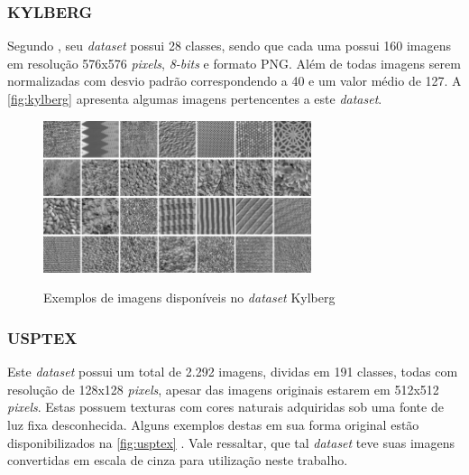 \subsubsection{KYLBERG}
\label{subsubsec:kylberg}

\par Segundo , seu \textit{dataset} possui 28 classes, sendo que cada uma possui 160 imagens em resolução 576x576 \textit{pixels}, \textit{8-bits} e formato PNG. Além de todas imagens serem normalizadas com desvio padrão correspondendo a 40 e um valor médio de 127. A \autoref{fig:kylberg} apresenta algumas imagens pertencentes a este \textit{dataset}.

\begin{figure}[!h]
    \centering
    \caption{Exemplos de imagens disponíveis no \textit{dataset} Kylberg}
    \includegraphics[width=0.7\textwidth]{./dados/figuras/kylberg.jpg}
    \label{fig:kylberg}
\end{figure}


\subsubsection{USPTEX}
\label{subsubsec:usptex}

\par Este \textit{dataset} possui um total de 2.292 imagens, dividas em 191 classes, todas com resolução de 128x128 \textit{pixels}, apesar das imagens originais estarem em 512x512 \textit{pixels}. Estas possuem texturas com cores naturais adquiridas sob uma fonte de luz fixa desconhecida. Alguns exemplos destas em sua forma original estão disponibilizados na \autoref{fig:usptex} \cite{usptex}. Vale ressaltar, que tal \textit{dataset} teve suas imagens convertidas em escala de cinza para utilização neste trabalho.

